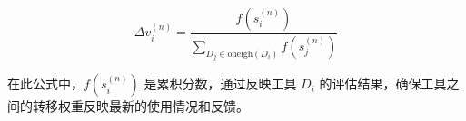 \[
\Delta v_i^{(n)} = \frac{f(s_i^{(n)})}{\sum_{D_j \in \text{oneigh}(D_i)} f(s_j^{(n)})}
\]

在此公式中，$f(s_i^{(n)})$ 是累积分数，通过反映工具 \( D_i \) 的评估结果，确保工具之间的转移权重反映最新的使用情况和反馈。







